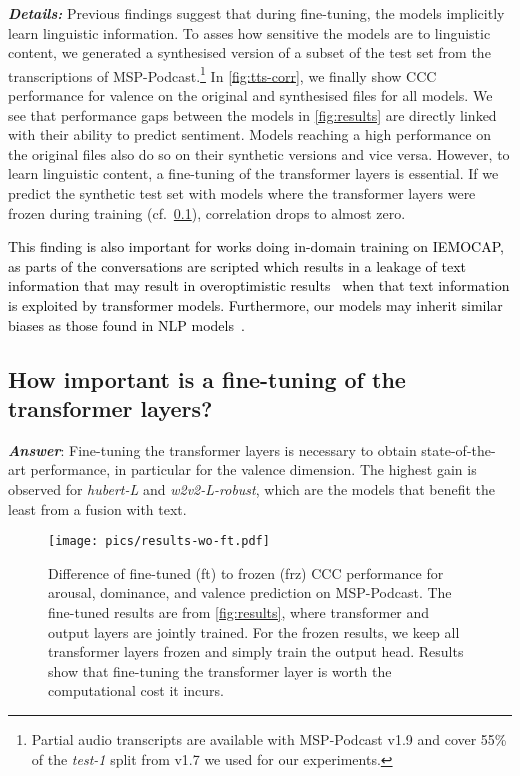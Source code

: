 \documentclass{article}
\newcommand\hlarge{\mbox{\emph{hubert-L}}}
\newcommand\wrobust{\mbox{\emph{w2v2-L-robust}}}
\newcommand{\review}[1]{\textcolor{black}{#1}}
\newcommand\msppodcast{\mbox{MSP-Podcast}}
\newcommand{\cf}{{cf.\ }}
\begin{document}
\noindent
\emph{\textbf{Details:}}
Previous findings suggest that during fine-tuning,
the models implicitly learn linguistic information.
To asses how sensitive the models are to linguistic content,
we generated a synthesised version of a subset of the test set
from the transcriptions of {\msppodcast}.\footnote{
Partial audio transcripts are available with {\msppodcast} v1.9
and cover 55\% of the \emph{test-1} split from v1.7 we used for our experiments.
}
In \cref{fig:tts-corr}, we finally show \ac{CCC} performance for valence
on the original and synthesised files for all models.
We see that performance gaps between the models in \cref{fig:results}
are directly linked with their ability to predict sentiment.
Models reaching a high performance on the original files also do so on their synthetic versions and vice versa.
However, to learn linguistic content, a fine-tuning of the transformer layers is essential.
If we predict the synthetic test set with models
where the transformer layers were frozen during training (\cf \cref{subsec:frozen}),
correlation drops to almost zero.

\review{
This finding
is also important
for works doing in-domain training
on IEMOCAP,
as parts of the conversations
are scripted
which results in a leakage of text information
that may result in overoptimistic results~\citep{pepino2020fusion}
when that text information is exploited by transformer models.
Furthermore,
our models may inherit
similar biases
as those found in NLP models~\citep{triantafyllopoulos2022probing}.
}




\subsection{How important is a fine-tuning of the transformer layers?}
\label{subsec:frozen}

\emph{\textbf{Answer}}:
Fine-tuning the transformer layers is necessary to obtain state-of-the-art performance,
in particular for the valence dimension.
The highest gain is observed for {\hlarge} and {\wrobust},
which are the models that benefit the least from a fusion with text.

\begin{figure}[t]
    \centering
    \texttt{[image: pics/results-wo-ft.pdf]}
    \caption{
        Difference of fine-tuned (ft) to frozen (frz) \ac{CCC} performance for arousal, dominance, and valence prediction on {\msppodcast}.
        The fine-tuned results are from \cref{fig:results}, where transformer and output layers are jointly trained.
        For the frozen results, we keep all transformer layers frozen and simply train the output head.
        Results show that fine-tuning the transformer layer is worth the computational cost it incurs.
    }
    \label{fig:wo-ft}
\end{figure}
\end{document}
